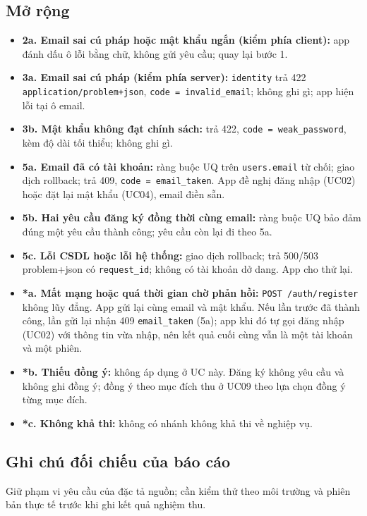 \subsection{Mở rộng}
\begin{itemize}
\item \textbf{2a. Email sai cú pháp hoặc mật khẩu ngắn (kiểm phía client):} app đánh dấu ô lỗi bằng chữ, không gửi yêu cầu; quay lại bước 1.
\item \textbf{3a. Email sai cú pháp (kiểm phía server):} {\small\texttt{identity}} trả 422 {\small\texttt{application/\allowbreak{}\allowbreak{}problem+json}}, {\small\texttt{code = invalid\_\allowbreak{}\allowbreak{}email}}; không ghi gì; app hiện lỗi tại ô email.
\item \textbf{3b. Mật khẩu không đạt chính sách:} trả 422, {\small\texttt{code = weak\_\allowbreak{}\allowbreak{}password}}, kèm độ dài tối thiểu; không ghi gì.
\item \textbf{5a. Email đã có tài khoản:} ràng buộc UQ trên {\small\texttt{users.\allowbreak{}email}} từ chối; giao dịch rollback; trả 409, {\small\texttt{code = email\_\allowbreak{}\allowbreak{}taken}}. App đề nghị đăng nhập (UC02) hoặc đặt lại mật khẩu (UC04), email điền sẵn.
\item \textbf{5b. Hai yêu cầu đăng ký đồng thời cùng email:} ràng buộc UQ bảo đảm đúng một yêu cầu thành công; yêu cầu còn lại đi theo 5a.
\item \textbf{5c. Lỗi CSDL hoặc lỗi hệ thống:} giao dịch rollback; trả 500/\allowbreak{}503 problem+json có {\small\texttt{request\_\allowbreak{}\allowbreak{}id}}; không có tài khoản dở dang. App cho thử lại.
\item \textbf{*a. Mất mạng hoặc quá thời gian chờ phản hồi:} {\small\texttt{POST /\allowbreak{}\allowbreak{}auth/\allowbreak{}\allowbreak{}register}} không lũy đẳng. App gửi lại cùng email và mật khẩu. Nếu lần trước đã thành công, lần gửi lại nhận 409 {\small\texttt{email\_\allowbreak{}\allowbreak{}taken}} (5a); app khi đó tự gọi đăng nhập (UC02) với thông tin vừa nhập, nên kết quả cuối cùng vẫn là một tài khoản và một phiên.
\item \textbf{*b. Thiếu đồng ý:} không áp dụng ở UC này. Đăng ký không yêu cầu và không ghi đồng ý; đồng ý theo mục đích thu ở UC09 theo lựa chọn đồng ý từng mục đích.
\item \textbf{*c. Không khả thi:} không có nhánh không khả thi về nghiệp vụ.
\end{itemize}
\subsection{Ghi chú đối chiếu của báo cáo}
Giữ phạm vi yêu cầu của đặc tả nguồn; cần kiểm thử theo môi trường và phiên bản thực tế trước khi ghi kết quả nghiệm thu.

